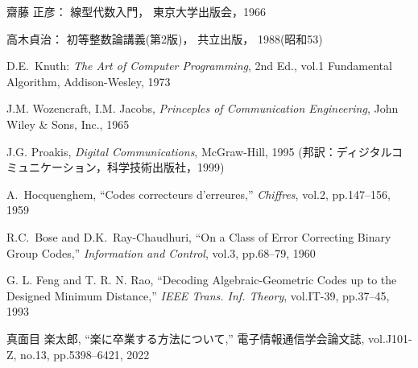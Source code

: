 ﻿%
\begin{thebibliography}{9}%
齋藤 正彦：
線型代数入門，
東京大学出版会，1966

高木貞治：
初等整数論講義(第2版)，
共立出版，
1988(昭和53)

D.E.~Knuth:
{\it The Art of Computer Programming},
2nd Ed.,
vol.1 Fundamental Algorithm,
Addison-Wesley,
1973

J.M. Wozencraft, 
I.M. Jacobs,
{\it Princeples of Communication Engineering},
John Wiley \& Sons, Inc., 1965

J.G. Proakis, 
{\it Digital Communications},
McGraw-Hill, 1995
(邦訳：ディジタルコミュニケーション，科学技術出版社，1999)


A.~Hocquenghem,
``Codes correcteurs d'erreures,''
{\it Chiffres}, vol.2, pp.147--156, 1959

R.C.~Bose and D.K.~Ray-Chaudhuri,
``On a Class of Error Correcting Binary Group Codes,''
{\it Information and Control}, vol.3, pp.68--79, 1960

G. L. Feng and T. R. N. Rao,
``Decoding Algebraic-Geometric Codes
up to the Designed Minimum Distance,''
{\it IEEE Trans. Inf. Theory},
vol.IT-39, pp.37--45, 1993

真面目 楽太郎,
``楽に卒業する方法について,''
電子情報通信学会論文誌,
vol.J101-Z, no.13, pp.5398--6421, 2022

\end{thebibliography}
